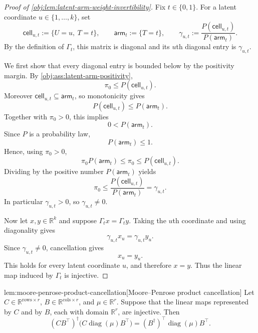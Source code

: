 \documentclass[11pt]{article}
\begin{document}
\begin{proof}[Proof of \cref{obj:lem:latent-arm-weight-invertibility}]
Fix \(t\in\{0,1\}\). For a latent coordinate \(u\in\{1,\ldots,k\}\), set
\[
\mathsf{cell}_{u,t}:=\{U=u,\ T=t\},
\qquad
\mathsf{arm}_{t}:=\{T=t\},
\qquad
\gamma_{u,t}:=\frac{P(\mathsf{cell}_{u,t})}{P(\mathsf{arm}_t)} .
\]
By the definition of \(\Gamma_t\), this matrix is diagonal and its \(u\)th diagonal entry is \(\gamma_{u,t}\). %

We first show that every diagonal entry is bounded below by the positivity margin. By \cref{obj:ass:latent-arm-positivity},
\[
\pi_0\le P(\mathsf{cell}_{u,t}).
\]
Moreover \(\mathsf{cell}_{u,t}\subseteq \mathsf{arm}_t\), so monotonicity gives
\[
P(\mathsf{cell}_{u,t})\le P(\mathsf{arm}_t).
\]
Together with \(\pi_0>0\), this implies
\[
0<P(\mathsf{arm}_t).
\]
Since \(P\) is a probability law,
\[
P(\mathsf{arm}_t)\le 1.
\]
Hence, using \(\pi_0>0\),
\[
\pi_0 P(\mathsf{arm}_t)
\le \pi_0
\le P(\mathsf{cell}_{u,t}).
\]
Dividing by the positive number \(P(\mathsf{arm}_t)\) yields
\[
\pi_0
\le
\frac{P(\mathsf{cell}_{u,t})}{P(\mathsf{arm}_t)}
=
\gamma_{u,t}.
\]
In particular \(\gamma_{u,t}>0\), so \(\gamma_{u,t}\ne0\). %

Now let \(x,y\in\mathbb R^k\) and suppose \(\Gamma_t x=\Gamma_t y\). Taking the \(u\)th coordinate and using diagonality gives
\[
\gamma_{u,t}x_u=\gamma_{u,t}y_u .
\]
Since \(\gamma_{u,t}\ne0\), cancellation gives
\[
x_u=y_u .
\]
This holds for every latent coordinate \(u\), and therefore \(x=y\). Thus the linear map induced by \(\Gamma_t\) is injective. %
\end{proof}

\begin{lemmav}{lem:moore-penrose-product-cancellation}[Moore--Penrose product cancellation]
Let \(C\in\mathbb R^{\mathrm{rows}\times r}\), \(B\in\mathbb R^{\mathrm{cols}\times r}\), and \(\mu\in\mathbb R^r\). Suppose that the linear maps represented by \(C\) and by \(B\), each with domain \(\mathbb R^r\), are injective. Then
\[
(CB^\top)^\dagger\bigl(C\operatorname{diag}(\mu)B^\top\bigr)
=
(B^\dagger)^\top \operatorname{diag}(\mu)B^\top .
\]
\end{lemmav}
\end{document}
